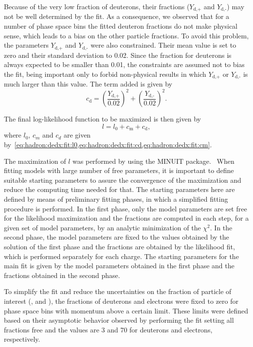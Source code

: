 Because of the very low fraction of deuterons,
their fractions ($Y_\text{d,+}$ and $Y_\text{d,-}$)
may not be well determined by the fit. As a consequence, we
observed that for a number of phase space bins the fitted deuteron
fractions do not make physical sense, which leads to a bias
on the other particle fractions. To avoid this problem,
the parameters $Y_\text{d,+}$ and $Y_\text{d,-}$ were also
constrained. Their mean value is set
to zero and their standard deviation to 0.02.
Since the fraction for deuterons is always expected
to be smaller than 0.01, the constraints
are assumed not to bias the fit, being important
only to forbid non-physical results
in which $Y_\text{d,+}$ or $Y_\text{d,-}$ is much larger than this value.
The term added is given by
\begin{equation}
  c_\text{d} = \left(\frac{Y_\text{d,+}}{0.02}\right)^2+\left(\frac{Y_\text{d,-}}{0.02}\right)^2.
  \label{eq:hadron:dedx:fit:cd}
\end{equation}

The final log-likelihood function to be maximized is then
given by
\begin{equation}
  l = l_0+c_\text{m}+c_\text{d},
  \label{eq:hadron:dedx:fit:l}
\end{equation}
where $l_0$, $c_m$ and $c_d$ are given
by~\cref{eq:hadron:dedx:fit:l0,eq:hadron:dedx:fit:cd,eq:hadron:dedx:fit:cm}.

The maximization of $l$
was performed by using the MINUIT package.~\cite{James:1975dr}
When fitting models with large number of free parameters,
it is important to define suitable starting parameters
to assure the convergence of the maximization and
reduce the computing time needed for that.
The starting parameters here are defined by means of
preliminary fitting phases, in which a simplified fitting
procedure is performed. In the first phase, only the model
parameters are set free for the likelihood maximization
and the fractions are computed in each step,
for a given set of model parameters, by an
analytic minimization of the $\chi^2$.
In the second phase, the model parameters are fixed
to the values obtained by the solution of the first phase
and the fractions are obtained by the likelihood fit,
which is performed separately for each charge.
The starting parameters for the main fit is given by
the model parameters obtained in the first phase and the
fractions obtained in the second phase.

To simplify the fit and reduce the uncertainties on the
fraction of particle of interest (\pions, \kaons and \protonpm),
the fractions of deuterons and electrons were fixed to zero
for phase space bins with momentum above a certain limit. These limits were
defined based on their asymptotic behavior observed by performing
the fit setting all fractions free and the values are 3 and 70 \GeVc
for deuterons and electrons, respectively. 


